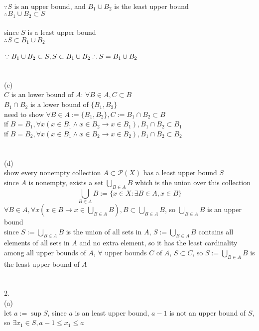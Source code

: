 \documentclass[12pt, border = 4pt, multi]{article} %
\begin{document}
\\
$\because S$ is an upper bound, and $B_1 \cup B_2$ is the least upper bound\\
$\therefore B_1 \cup B_2 \subset S$\\
\\
since $S$ is a least upper bound\\
$\therefore S \subset B_1 \cup B_2$\\
\\
$\because B_1 \cup B_2 \subset S, S \subset B_1 \cup B_2\\
\therefore S = B_1 \cup B_2$\\
\\
\\
(c)\\
$C$ is an lower bound of $A$: $\forall B \in A, C \subset B$\\
$B_1 \cap B_2$ is a lower bound of $\{B_1, B_2\}$\\
need to show $\forall B \in A := \{B_1, B_2\}, C :=  B_1 \cap B_2 \subset B$\\
if $B = B_1, \forall x (x \in B_1 \wedge x \in B_2 \rightarrow x \in B_1), B_1 \cap B_2 \subset B_1$\\
if $B = B_2, \forall x (x \in B_1 \wedge x \in B_2 \rightarrow x \in B_2), B_1 \cap B_2 \subset B_2$\\
\\
\\
(d)\\
show every nonempty collection $A \subset \mathcal{P}(X)$ has a least upper bound $S$\\
since $A$ is nonempty, exists a set $\bigcup_{B \in A} B$ which is the union over this collection
\[\bigcup_{B \in A} B := \{x \in X: \exists B \in A, x \in B\}\]
$\forall B \in A, \forall x(x \in B \rightarrow x \in \bigcup_{B \in A} B), B \subset \bigcup_{B \in A} B$, so $\bigcup_{B \in A} B$ is an upper bound\\
since $S := \bigcup_{B \in A} B$ is the union of all sets in $A$, $S := \bigcup_{B \in A} B$ contains all elements of all sets in $A$ and no extra element, so it has the least cardinality among all upper bounds of $A$, $\forall$ upper bounds $C$ of $A$, $S \subset C$, so $S := \bigcup_{B \in A} B$ is the least upper bound of $A$\\
\\
\\
2.\\
(a)\\
let $a := \sup S$, since $a$ is an least upper bound, $a - 1$ is not an upper bound of $S$, so $\exists x_1 \in S, a - 1 \leq x_1 \leq a$\\
\end{document}
